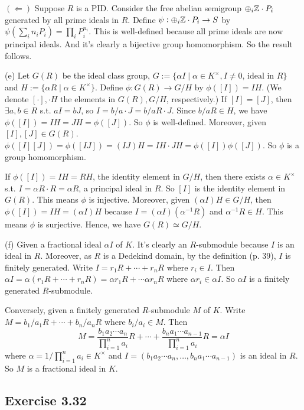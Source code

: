\documentclass[../Marcus.tex]{subfiles}
\begin{document}
$(\Leftarrow)$ Suppose $R$ is a PID. Consider the free abelian semigroup $\oplus_{i} \mathbb{Z}\cdot P_i$ generated by all prime ideals in $R$. Define $\psi:\oplus_{i} \mathbb{Z}\cdot P_i \to S$ by $\psi(\sum_i n_iP_i)=\prod_i P_i^{n_i}$. This is well-defined because all prime ideals are now principal ideals. And it's clearly a bijective group homomorphism. So the result follows.

(e) Let $G(R)$ be the ideal class group, $G:=\{\alpha I\mid \alpha\in K^\times, I\neq 0\text{, ideal in } R\}$ and $H:=\{\alpha R\mid \alpha\in K^\times\}$. Define $\phi:G(R)\to G/H$ by $\phi([I])=IH$. (We denote $[\cdot],\cdot H$ the elements in $G(R),G/H$, respectively.) If $[I]=[J]$, then $\exists a,b\in R$ s.t. $aI=bJ$, so $I=b/a\cdot J=b/aR\cdot J$. Since $b/aR\in H$, we have $\phi([I])=IH=JH=\phi([J])$. So $\phi$ is well-defined. Moreover, given $[I],[J]\in G(R)$. $\phi([I][J])=\phi([IJ])=(IJ)H=IH\cdot JH=\phi([I])\phi([J])$. So $\phi$ is a group homomorphism.

If $\phi([I])=IH=RH$, the identity element in $G/H$, then there exists $\alpha\in K^\times$ s.t. $I=\alpha R\cdot R=\alpha R$, a principal ideal in $R$. So $[I]$ is the identity element in $G(R)$. This means $\phi$ is injective. Moreover, given $(\alpha I)H\in G/H$, then $\phi([I])=IH=(\alpha I)H$ because $I=(\alpha I)(\alpha^{-1}R)$ and $\alpha^{-1}R\in H$. This means $\phi$ is surjective. Hence, we have $G(R)\simeq G/H$.

(f) Given a fractional ideal $\alpha I$ of $K$. It's clearly an $R$-submodule because $I$ is an ideal in $R$. Moreover, as $R$ is a Dedekind domain, by the definition (p. 39), $I$ is finitely generated. Write $I=r_1R+\cdots+r_nR$ where $r_i\in I$. Then $\alpha I=\alpha(r_1R+\cdots+r_nR)=\alpha r_1R+\cdots\alpha r_nR$ where $\alpha r_i\in\alpha I$. So $\alpha I$ is a finitely generated $R$-submodule. 

Conversely, given a finitely generated $R$-submodule $M$ of $K$. Write $M=b_1/a_1R+\cdots+b_n/a_nR$ where $b_i/a_i\in M$. Then $$M=\frac{b_1a_2\cdots a_n}{\prod_{i=1}^n a_i}R+\cdots+\frac{b_na_1\cdots a_{n-1}}{\prod_{i=1}^n a_i}R=\alpha I$$ where $\alpha=1/\prod_{i=1}^n a_i\in K^\times$ and $I=(b_1a_2\cdots a_n,\ldots,b_na_1\cdots a_{n-1})$ is an ideal in $R$. So $M$ is a fractional ideal in $K$.

\subsection*{Exercise 3.32}
\end{document}
